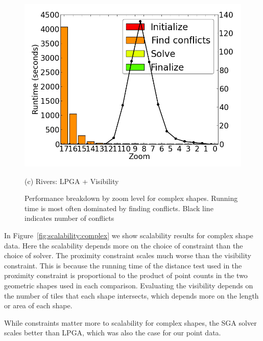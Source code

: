 \begin{figure}[tb]
\begin{minipage}{0.329\linewidth}
    \centerline{\includegraphics[width=1.0\linewidth]{./figs/prelim_lin_30k_uswaterway_lp_A.png}}
    \centerline{(c) Rivers: LPGA + Visibility}
  \end{minipage}
  \vspace{-0ex}
  \caption{Performance breakdown by zoom level for complex shapes. Running time is most often dominated by finding conflicts. Black line indicates number of conflicts} \label{fig:performance:complex}
  \vspace{-2ex}
\end{figure}



In Figure~\ref{fig:scalability:complex} we show scalability results for complex shape data. Here the scalability depends more on the choice of constraint than the choice of solver. The proximity constraint scales much worse than the visibility constraint. This is because the running time of the distance test used in the proximity constraint is proportional to the product of point counts in the two geometric shapes used in each comparison. Evaluating the visibility depends on the number of tiles that each shape intersects, which depends more on the length or area of each shape. 

While constraints matter more to scalability for complex shapes, the SGA solver scales better than LPGA, which was also the case for our point data.

